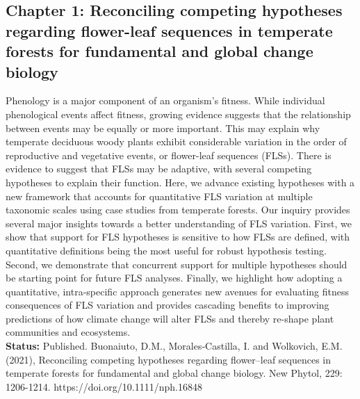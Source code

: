 \documentclass[11pt]{article}\usepackage[]{graphicx}\usepackage[]{color}
\begin{document}
\subsection{Chapter 1: Reconciling competing hypotheses regarding flower-leaf sequences in temperate forests for fundamental and global change biology}
Phenology is a major component of an organism's fitness. While individual phenological events affect fitness, growing evidence suggests that the relationship between events may be equally or more important. This may explain why temperate deciduous woody plants exhibit considerable variation in the order of reproductive and vegetative events, or flower-leaf sequences (FLSs). There is evidence to suggest that FLSs may be adaptive, with several competing hypotheses to explain their function. Here, we advance existing hypotheses with a new framework that accounts for quantitative FLS variation at multiple taxonomic scales using case studies from temperate forests. Our inquiry provides several major insights towards a better understanding of FLS variation. First, we show that support for FLS hypotheses is sensitive to how FLSs are defined, with quantitative definitions being the most useful for robust hypothesis testing. Second, we demonstrate that concurrent support for multiple hypotheses should be starting point for future FLS analyses. Finally, we highlight how adopting a quantitative, intra-specific approach generates new avenues for evaluating fitness consequences of FLS variation and provides cascading benefits to improving predictions of how climate change will alter FLSs and thereby re-shape plant communities and ecosystems.\\

\textbf{Status:} Published. Buonaiuto, D.M., Morales‐Castilla, I. and Wolkovich, E.M. (2021), Reconciling competing hypotheses regarding flower–leaf sequences in temperate forests for fundamental and global change biology. New Phytol, 229: 1206-1214. https://doi.org/10.1111/nph.16848
\end{document}
